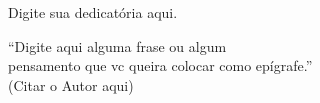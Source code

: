 \documentclass[article,12pt,oneside,a4paper,chapter=TITLE,
			   english,brazil]{abntex2}
\begin{document}
\frenchspacing 


\pretextual


\imprimircapa


\imprimirfolhaderosto


%    


\setlength{\ABNTEXsignwidth}{8cm}    %
\folhadeaprovacaoUEPB

%


\newpage
\begin{dedicatoria}
   \vspace*{\fill}
	\hspace{.45\textwidth}
	\begin{minipage}{.5\textwidth}
	    Digite sua dedicatória aqui.
	\end{minipage}
\end{dedicatoria}


\newpage
\begin{epigrafe}
    \vspace*{\fill}
	\begin{flushright}
		``Digite aqui alguma frase ou algum \\
		pensamento que vc queira colocar como epígrafe.'' \\
		(Citar o Autor aqui)
	\end{flushright}
\end{epigrafe}
\end{document}
